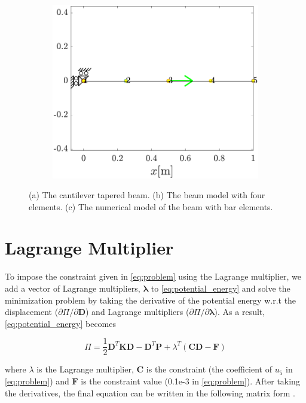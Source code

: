 \documentclass{article}
\begin{document}
\begin{figure}[ht]
\begin{subfigure}{0.49\textwidth}
            \includegraphics[width=1\linewidth]{figures/beam_fem.pdf} 
            \caption{}
            \label{fig:beam_fem}
        \end{subfigure}
    \caption{(a) The cantilever tapered beam. (b) The beam model with four elements. (c) The numerical model of the beam with bar elements.}
    \label{fig:beam_problem}
\end{figure}

\section{Lagrange Multiplier}
To impose the constraint given in \cref{eq:problem} using the Lagrange multiplier, we add a vector of Lagrange multipliers, $\mathbf{\lambda}$ to \cref{eq:potential_energy} and solve the minimization problem by taking the derivative of the potential energy w.r.t the displacement ($\partial \Pi / \partial \mathbf{D}$) and Lagrange multipliers ($\partial \Pi / \partial \mathbf{\lambda}$). As a result, \cref{eq:potential_energy} becomes \cite{cook2001}

\begin{equation}
    \Pi = \dfrac{1}{2} \mathbf{D}^{T} \mathbf{K} \mathbf{D} -  \mathbf{D}^{T}  \mathbf{P} + \lambda^{T} ( \mathbf{C} \mathbf{D} -  \mathbf{F})
    \label{eq:lm}
\end{equation}

where $\lambda$ is the Lagrange multiplier, $\mathbf{C}$ is the constraint (the coefficient of $u_5$ in \cref{eq:problem}) and $\mathbf{F}$ is the constraint value (0.1e-3 in \cref{eq:problem}). After taking the derivatives, the final equation can be written in the following matrix form \cite{cook2001}.
\end{document}
